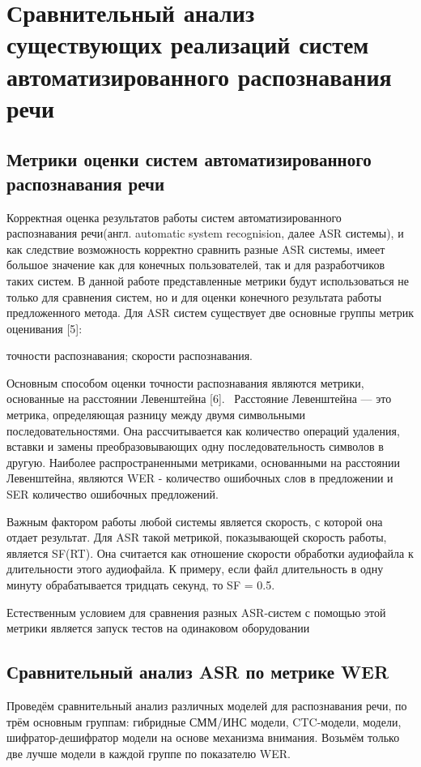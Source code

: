 \documentclass[conference]{IEEEtran}
\begin{document}
    \section{Сравнительный анализ существующих реализаций систем автоматизированного распознавания речи}

    \subsection{Метрики оценки систем автоматизированного распознавания речи}\label{AA}

    Корректная оценка результатов работы систем автоматизированного распознавания речи(англ. automatic system recognision, далее ASR системы), и как следствие возможность корректно сравнить разные ASR системы, имеет большое значение как для конечных пользователей, так и для разработчиков таких систем. В данной работе представленные метрики будут использоваться не только для сравнения систем, но и для оценки конечного результата работы предложенного метода.
    Для ASR систем существует две основные группы метрик оценивания [5]:
    \begin{itemize}
         точности распознавания;
         скорости распознавания.
    \end{itemize}

    Основным способом оценки точности распознавания являются метрики, основанные на расстоянии Левенштейна [6]. 
Расстояние Левенштейна — это метрика, определяющая разницу между двумя символьными последовательностями. Она рассчитывается как количество операций удаления, вставки и замены преобразовывающих одну последовательность символов в другую. Наиболее распространенными метриками, основанными на расстоянии Левенштейна, являются WER - количество ошибочных слов в предложении и SER количество ошибочных предложений.

Важным фактором работы любой системы является скорость, с которой она отдает результат. Для ASR такой метрикой, показывающей скорость работы, является SF(RT). Она считается как отношение скорости обработки аудиофайла к длительности этого аудиофайла. К примеру, если файл длительность в одну минуту обрабатывается тридцать секунд, то SF = 0.5.

Естественным условием для сравнения разных ASR-систем с помощью этой метрики является запуск тестов на одинаковом оборудовании

\subsection{Сравнительный анализ ASR по метрике WER}\label{AA}
Проведём сравнительный анализ различных моделей для распознавания речи, по трём основным группам: гибридные СММ/ИНС модели, CTC-модели, модели, шифратор-дешифратор модели на основе механизма внимания. Возьмём только две лучше модели в каждой группе по показателю WER.
\end{document}
